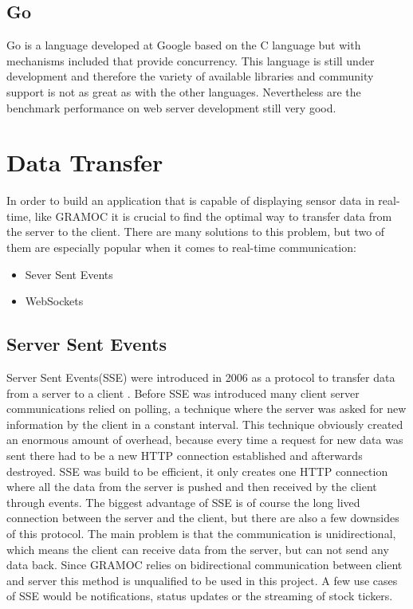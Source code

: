 \subsection{Go}
Go is a language developed at Google based on the C language but with mechanisms included that provide concurrency. This language is still under development and therefore the variety of available libraries and community support is not as great as with the other languages. Nevertheless are the benchmark performance on web server development still very good.

\section{Data Transfer}
In order to build an application that is capable of displaying sensor data in real-time, like GRAMOC it is crucial to find the optimal way to transfer data from the server to the client. There are many solutions to this problem, but two of them are especially popular when it comes to real-time communication:

\begin{itemize}
    \item Sever Sent Events
    \item WebSockets
\end{itemize}

\subsection{Server Sent Events}
\label{subsec:sse}
Server Sent Events(SSE) were introduced in 2006 as a protocol to transfer data from a server to a client \autocite{sse}. Before SSE was introduced many client server communications relied on polling, a technique where the server was asked for new information by the client in a constant interval. This technique obviously created an enormous amount of overhead, because every time a request for new data was sent there had to be a new HTTP connection established and afterwards destroyed. SSE was build to be efficient, it only creates one HTTP connection where all the data from the server is pushed and then received by the client through events. The biggest advantage of SSE is of course the long lived connection between the server and the client, but there are also a few downsides of this protocol. The main problem is that the communication is unidirectional, which means the client can receive data from the server, but can not send any data back. Since GRAMOC relies on bidirectional communication between client and server this method is unqualified to be used in this project. A few use cases of SSE would be notifications, status updates or the streaming of stock tickers.

